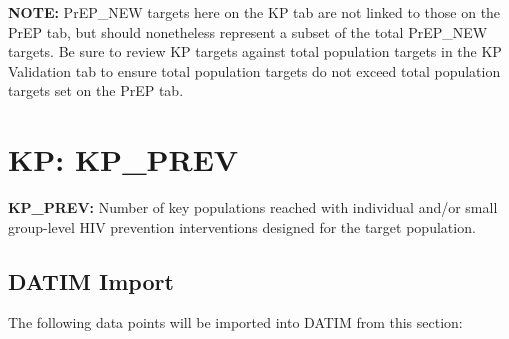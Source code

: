 \documentclass[
  openany]{book}
\begin{document}
\textbf{NOTE:} PrEP\_NEW targets here on the KP tab are not linked to those on
the PrEP tab, but should nonetheless represent a subset of the total
PrEP\_NEW targets. Be sure to review KP targets against total population
targets in the KP Validation tab to ensure total population targets do
not exceed total population targets set on the PrEP tab.

\hypertarget{kp-kp_prev}{%
\section{KP: KP\_PREV}\label{kp-kp_prev}}

\textbf{KP\_PREV:} Number of key populations reached with individual and/or
small group-level HIV prevention interventions designed for the target
population.

\begin{table}[H]
\centering\begingroup\fontsize{12}{14}\selectfont

\endgroup{}
\end{table}

\hypertarget{datim-import-46}{%
\subsection{DATIM Import}\label{datim-import-46}}

The following data points will be imported into DATIM from this section:
\end{document}

